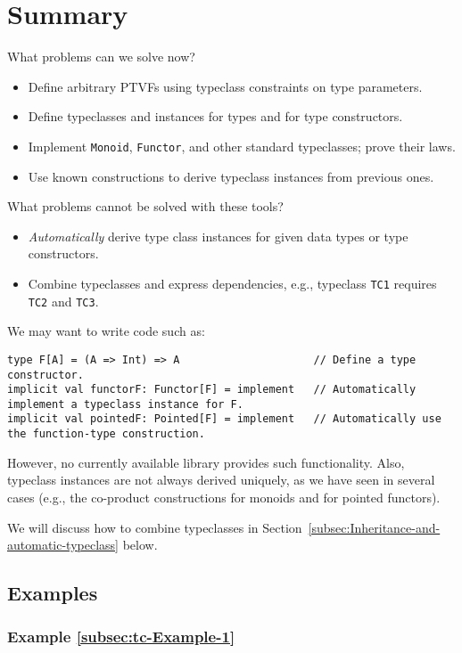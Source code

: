 \section{Summary}

What problems can we solve now?
\begin{itemize}
\item Define arbitrary PTVFs using typeclass constraints on type parameters.
\item Define typeclasses and instances for types and for type constructors.
\item Implement \lstinline!Monoid!, \lstinline!Functor!, and other standard
typeclasses; prove their laws.
\item Use known constructions to derive typeclass instances from previous
ones.
\end{itemize}
What problems cannot be solved with these tools?
\begin{itemize}
\item \emph{Automatically} derive type class instances for given data types
or type constructors.
\item Combine typeclasses and express dependencies, e.g., typeclass \lstinline!TC1!
requires \lstinline!TC2! and \lstinline!TC3!.
\end{itemize}
We may want to write code such as:
\begin{lstlisting}
type F[A] = (A => Int) => A                     // Define a type constructor.
implicit val functorF: Functor[F] = implement   // Automatically implement a typeclass instance for F.
implicit val pointedF: Pointed[F] = implement   // Automatically use the function-type construction.
\end{lstlisting}
However, no currently available library provides such functionality.
Also, typeclass instances are not always derived uniquely, as we have
seen in several cases (e.g., the co-product constructions for monoids
and for pointed functors).

We will discuss how to combine typeclasses in Section~\ref{subsec:Inheritance-and-automatic-typeclass}
below.

\subsection{Examples}

\subsubsection{Example \label{subsec:tc-Example-1}\ref{subsec:tc-Example-1}}

